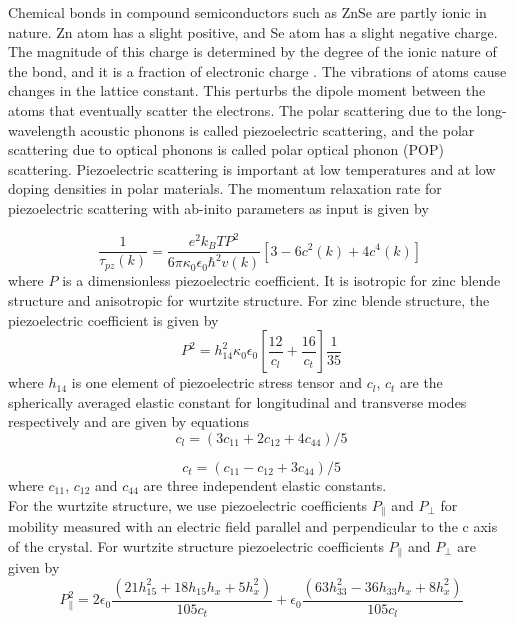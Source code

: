 \documentclass[12pt]{article}
\begin{document}
Chemical bonds in compound semiconductors such as ZnSe are partly ionic in nature. Zn atom has a slight positive, and Se atom has a slight negative charge. The magnitude of this charge is determined by the degree of the ionic nature of the bond, and it is a fraction of electronic charge \cite{ridley2013quantum}. The vibrations of atoms cause changes in the lattice constant. This perturbs the dipole moment between the atoms that eventually scatter the electrons. The polar scattering due to the long-wavelength acoustic phonons is called piezoelectric scattering, and the polar scattering due to optical phonons is called polar optical phonon (POP) scattering. Piezoelectric scattering is important at low temperatures and at low doping densities in polar materials. The momentum relaxation rate for piezoelectric scattering with ab-inito parameters as input is given by \cite{rode1}

\begin{equation}
\frac{1}{\tau_{pz}(k)} = \frac{e^2 k_B T P^2 }{6\pi \kappa_0 \epsilon_0\hbar^2 v(k)}[3 - 6c^2(k)+4c^4(k)] 
\label{pz}
\end{equation}
where $P$ is a dimensionless piezoelectric coefficient. It is isotropic for zinc blende structure and anisotropic for wurtzite structure. For zinc blende structure, the piezoelectric coefficient is given by \cite{rode1}
\begin{equation}
\ P^2 = h_{14}^2 \kappa_0 \epsilon_0 \left[ \frac{12}{c_l} + \frac{16}{c_t}\right] \frac{1}{35} 
\label{pzcoeff}
\end{equation}
where $h_{14}$ is one element of piezoelectric stress tensor and  $c_l$, $c_t$ are the spherically averaged elastic constant for longitudinal and transverse modes respectively and are given by \cite{rode3} equations
\begin{equation}
\ c_l = (3c_{11} + 2c_{12} + 4c_{44})/5 
\label{cl}
\end{equation}

\begin{equation}
\ c_t = (c_{11} - c_{12} + 3c_{44})/5 
\label{ct}
\end{equation}
where $c_{11}$, $c_{12}$ and $c_{44}$ are three independent elastic constants. \\
For the wurtzite structure, we use piezoelectric coefficients $P_\parallel$ and $P_\perp$ for mobility measured with an electric field parallel and perpendicular to the c axis of the crystal. For wurtzite structure piezoelectric coefficients $P_\parallel$ and $P_\perp$ are given by \cite{rode1,rode3}
\begin{equation}
\ P_{\parallel}^2 = 2 \epsilon_0 \frac{(21 h_{15}^2 + 18 h_{15} h_{x } + 5 h_x^2)}{105c_t} + \epsilon_0 \frac{(63 h_{33}^2 - 36 h_{33} h_x + 8 h_x^2)}{105c_l}  
\label{pzcoeff_para}
\end{equation}
\end{document}
